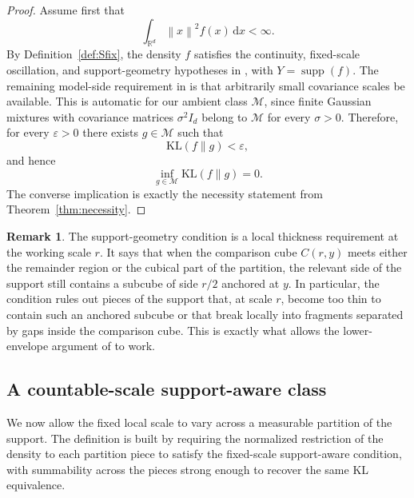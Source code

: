 \documentclass[11pt]{article}
\theoremstyle{definition}
\newtheorem{remark}[theorem]{Remark}
\begin{document}
\begin{proof}
Assume first that
\[
\int_{\mathbb{R}^d}\left\lVert x \right\rVert^2f(x)\,\mathrm{d}x<\infty.
\]
By Definition~\ref{def:Sfix}, the density $f$ satisfies the continuity, fixed-scale oscillation, and support-geometry hypotheses in \citet[Theorem~3]{NoretsPelenis2012}, with $Y=\operatorname{supp}(f)$. The remaining model-side requirement in \citet[Theorem~3]{NoretsPelenis2012} is that arbitrarily small covariance scales be available. This is automatic for our ambient class $\mathcal M$, since finite Gaussian mixtures with covariance matrices $\sigma^2 I_d$ belong to $\mathcal M$ for every $\sigma>0$. Therefore, for every $\varepsilon>0$ there exists $g\in\mathcal M$ such that
\[
\mathrm{KL}(f\|g)<\varepsilon,
\]
and hence
\[
\inf_{g\in\mathcal M}\mathrm{KL}(f\|g)=0.
\]
The converse implication is exactly the necessity statement from Theorem~\ref{thm:necessity}.
\end{proof}

\begin{remark}
The support-geometry condition is a local thickness requirement at the working scale $r$. It says that when the comparison cube $C(r,y)$ meets either the remainder region or the cubical part of the partition, the relevant side of the support still contains a subcube of side $r/2$ anchored at $y$. In particular, the condition rules out pieces of the support that, at scale $r$, become too thin to contain such an anchored subcube or that break locally into fragments separated by gaps inside the comparison cube. This is exactly what allows the lower-envelope argument of \citet{NoretsPelenis2012} to work.
\end{remark}

\subsection{A countable-scale support-aware class}

We now allow the fixed local scale to vary across a measurable partition of the support. The definition is built by requiring the normalized restriction of the density to each partition piece to satisfy the fixed-scale support-aware condition, with summability across the pieces strong enough to recover the same KL equivalence.
\end{document}
